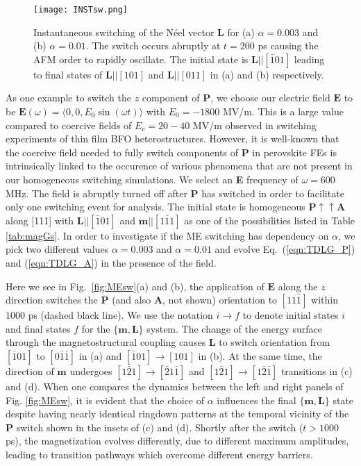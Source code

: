 \documentclass[%
 reprint,
superscriptaddress,
 amsmath,amssymb,
prb,
]{revtex4-1}
\begin{document}
\begin{figure}\centering
\texttt{[image: INSTsw.png]}%
\caption{\label{fig:MEswINST} Instantaneous switching of the N\'{e}el vector $\mathbf{L}$ for (a) $\alpha = 0.003$ and (b) $\alpha = 0.01$. The switch occurs abruptly at $t = 200$ ps causing the AFM order to rapidly oscillate. The initial state is $\mathbf{L}||[\bar{1}01]$ leading to final states of $\mathbf{L}||[101]$ and $\mathbf{L}||[011]$ in (a) and (b) respectively.}
\end{figure}
%

%
As one example to switch the $z$ component of $\mathbf{P}$, we choose our electric field $\mathbf{E}$ to be $\mathbf{E}(\omega) = \langle 0,0,E_0 \sin{\left(\omega t\right)}\rangle$ with $E_0 = -1800$ MV/m.
%
This is a large value compared to coercive fields of $E_c = 20-40$ MV/m observed in switching experiments of thin film BFO heterostructures\cite{Wang2003, Heron2014}.
%
However, it is well-known that the coercive field needed to fully switch components of $\mathbf{P}$ in perovskite FEs is intrinsically linked to the occurence of various phenomena\cite{Morozovska2005,Bratkovsky2000,Indergand2020, Gerra2005, Liu2016} that are not present in our homogeneous switching simulations. 
%
We select an \textbf{E} frequency of $\omega = 600$ MHz.
%
The field is abruptly turned off after $\mathbf{P}$ has switched in order to facilitate only one switching event for analysis.
%
The initial state is homogeneous $\mathbf{P}\uparrow\uparrow\mathbf{A}$ along [111] with $\mathbf{L}||[\bar{1}01]$ and $\mathbf{m}||[1\bar{1}1]$ as one of the possibilities listed in Table \ref{tab:magGs}.
%
In order to investigate if the ME switching has dependency on $\alpha$, we pick two different values $\alpha = 0.003$ and $\alpha = 0.01$ and evolve Eq.~(\ref{eqn:TDLG_P}) and (\ref{eqn:TDLG_A}) in the presence of the field.
%

%


%
Here we see in Fig.~\ref{fig:MEsw}(a) and (b), the application of $\mathbf{E}$ along the $z$ direction switches the $\mathbf{P}$ (and also $\mathbf{A}$, not shown) orientation to $[11\bar{1}]$ within $1000$ ps (dashed black line).
%
We use the notation $i\to f$ to denote initial states $i$ and final states $f$ for the $\{\mathbf{m},\mathbf{L}\}$ system.
%
The change of the energy surface through the magnetostructural coupling causes $\mathbf{L}$ to switch orientation from $[\bar{1}01]$ to $[0\bar{1}\bar{1}]$ in (a) and $[\bar{1}01]\to[101]$ in (b).
%
At the same time, the direction of $\mathbf{m}$ undergoes $[1\bar{2}1]\to[\bar{2}1\bar{1}]$ and $[1\bar{2}1]\to[1\bar{2}\bar{1}]$ transitions in (c) and (d).
%
When one compares the dynamics between the left and right panels of Fig. \ref{fig:MEsw}, it is evident that the choice of $\alpha$ influences the final $\{\mathbf{m},\mathbf{L}\}$ state despite having nearly identical ringdown patterns at the temporal vicinity of the $\mathbf{P}$ switch shown in the insets of (c) and (d).
%
Shortly after the switch ($t > 1000$ ps), the magnetization evolves differently, due to different maximum amplitudes, leading to transition pathways which overcome different energy barriers.
%
\end{document}
